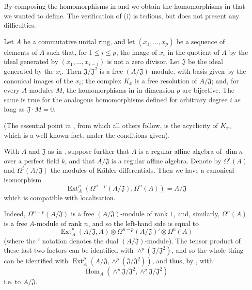 By composing the homomorphisms in  and  we obtain the homomorphisms in  that we wanted to define.
The verification of (i) is tedious, but does not present any difficulties.

\begin{proposition}\label{fga1-proposition-4}
  Let $A$ be a commutative unital ring, and let $(x_1,\ldots,x_p)$  be a sequence of elements of $A$ such that, for $1\leqslant i\leqslant p$, the image of $x_i$ in the quotient of $A$ by the ideal generated by $(x_1,\ldots,x_{i-1})$ is not a zero divisor.
  Let $\mathfrak{J}$ be the ideal generated by the $x_i$.
  Then $\mathfrak{J}/\mathfrak{J}^2$ is a free $(A/\mathfrak{J})$-module, with basis given by the canonical images of the $x_i$;
  the complex $K_x$ is a free resolution of $A/\mathfrak{J}$;
  and, for every $A$-modules $M$, the homomorphisms in  in dimension $p$ are bijective.
  The same is true for the analogous homomorphisms defined for arbitrary degree $i$ as long as $\mathfrak{J}\cdot M=0$.
\end{proposition}

(The essential point in , from which all others follow, is the acyclicity of $K_x$, which is a well-known fact, under the conditions given).


\begin{corollary}\label{fga1-proposition-4-corollary-1}
  With $A$ and $\mathfrak{J}$ as in , suppose further that $A$ is a regular affine algebra of $\dim n$ over a perfect field $k$, and that $A/\mathfrak{J}$ is a regular affine algebra.
  Denote by $\Omega^i(A)$ and $\Omega^i(A/\mathfrak{J})$ the modules of Kähler differentials.
  Then we have a canonical isomorphism
  \begin{equation}\tag{3.5}\label{fga1-equation-3.5}
    \operatorname{Ext}_A^p(\Omega^{n-p}(A/\mathfrak{J}),\Omega^n(A)) = A/\mathfrak{J}
  \end{equation}
  which is compatible with localisation.
\end{corollary}

\begin{cproof}
  Indeed, $\Omega^{n-p}(A/\mathfrak{J})$ is a free $(A/\mathfrak{J})$-module of rank $1$, and, similarly, $\Omega^n(A)$ is a free $A$-module of rank $n$, and so the left-hand side is equal to
  \[\operatorname{Ext}_A^p(A/\mathfrak{J},A) \otimes \Omega^{n-p}(A/\mathfrak{J})' \otimes \Omega^n(A)\]
  (where the $'$ notation denotes the dual $(A/\mathfrak{J})$-module).
  The tensor product of these last two factors can be identified with $\wedge^p(\mathfrak{J}/\mathfrak{J}^2)$, and so the whole thing can be identified with $\operatorname{Ext}_A^p(A/\mathfrak{J},\wedge^p(\mathfrak{J}/\mathfrak{J}^2))$, and thus, by , with
  \[\operatorname{Hom}_A(\wedge^p \mathfrak{J}/\mathfrak{J}^2,\wedge^p \mathfrak{J}/\mathfrak{J}^2)\]
  i.e. to $A/\mathfrak{J}$.
\end{cproof}

